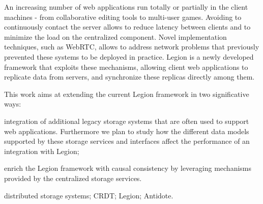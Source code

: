 An increasing number of web applications run totally or partially in the client machines - from collaborative editing tools to multi-user games. Avoiding to continuously contact the server allows to reduce latency between clients and to minimize the load on the centralized component. Novel implementation techniques, such as WebRTC, allows to address network problems that previously prevented these systems to be deployed in practice. Legion is a newly developed framework that exploits these mechanisms, allowing client web applications to replicate data from servers, and synchronize these replicas directly among them.\par
	This work aims at extending the current Legion framework in two significative ways: \begin{enumerate*}[(i)]
	\item integration of additional legacy storage systems that are often used to support web applications. Furthermore we plan to study how the different data models supported by these storage services and interfaces affect the performance of an integration with Legion;
	\item enrich the Legion framework with causal consistency by leveraging mechanisms provided by the centralized storage services.

\end{enumerate*}

\begin{keywords}
distributed storage systems; CRDT; Legion; Antidote.
\end{keywords} 
